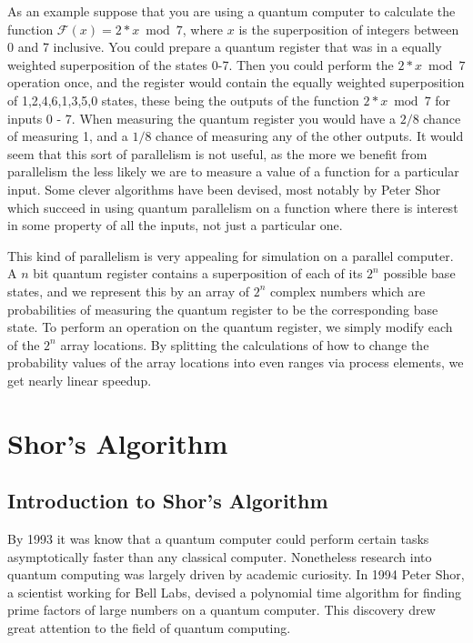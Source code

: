 \documentclass[]{article}
\begin{document}
As an example suppose that you are using a quantum computer to
calculate the function $\mathcal{F}(x) = 2*x \bmod 7$, where $x$ is
the superposition of integers between 0 and 7 inclusive. You could
prepare a quantum register that was in a equally weighted
superposition of the states 0-7. Then you could perform the $2*x
\bmod 7$ operation once, and the register would contain the equally
weighted superposition of 1,2,4,6,1,3,5,0 states, these being the
outputs of the function $2*x \bmod 7$ for inputs 0 - 7. When
measuring the quantum register you would have a $2/8$ chance of
measuring 1, and a $1/8$ chance of measuring any of the other
outputs. It would seem that this sort of parallelism is not useful,
as the more we benefit from parallelism the less likely we are to
measure a value of a function for a particular input. Some clever
algorithms have been devised, most notably by Peter Shor which succeed
in using quantum parallelism on a function where there is interest in
some property of all the inputs, not just a particular one.

This kind of parallelism is very appealing for simulation on a
parallel computer.  A $n$ bit quantum register contains a
superposition of each of its $2^{n}$ possible base states, and we
represent this by an array of $2^{n}$ complex numbers which are
probabilities of measuring the quantum register to be the
corresponding base state.  To perform an operation on the quantum
register, we simply modify each of the $2^n$ array locations.  By
splitting the calculations of how to change the probability values of
the array locations into even ranges via process elements, we get
nearly linear speedup.  

\section{Shor's Algorithm}

\subsection{Introduction to Shor's Algorithm}

By 1993 it was know that a quantum computer could perform certain
tasks asymptotically faster than any classical computer. Nonetheless
research into quantum computing was largely driven by academic
curiosity. In 1994 Peter Shor, a scientist working for Bell Labs,
devised a polynomial time algorithm for finding prime factors of large
numbers on a quantum computer. This discovery drew great attention to
the field of quantum computing.
\end{document}
